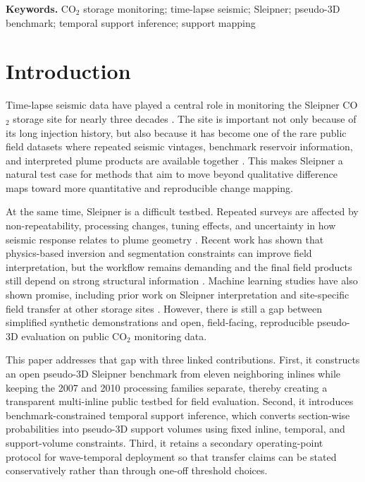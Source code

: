 \documentclass[preprint,12pt]{elsarticle}
\begin{document}
\noindent\textbf{Keywords.} CO$_2$ storage monitoring; time-lapse seismic; Sleipner; pseudo-3D benchmark; temporal support inference; support mapping
\fi

\section{Introduction}

Time-lapse seismic data have played a central role in monitoring the Sleipner CO$_2$ storage site for nearly three decades \citep{furre2017sleipner}. The site is important not only because of its long injection history, but also because it has become one of the rare public field datasets where repeated seismic vintages, benchmark reservoir information, and interpreted plume products are available together \citep{equinor2020seismic,equinor2020benchmark}. This makes Sleipner a natural test case for methods that aim to move beyond qualitative difference maps toward more quantitative and reproducible change mapping.

At the same time, Sleipner is a difficult testbed. Repeated surveys are affected by non-repeatability, processing changes, tuning effects, and uncertainty in how seismic response relates to plume geometry \citep{rickett2001crossequalization,alali2020crossequalization,romero2023joint}. Recent work has shown that physics-based inversion and segmentation constraints can improve field interpretation, but the workflow remains demanding and the final field products still depend on strong structural information \citep{romero2023joint,fachtony2025sleipner}. Machine learning studies have also shown promise, including prior work on Sleipner interpretation and site-specific field transfer at other storage sites \citep{li2021sleipnernn,leong2024seisco2net}. However, there is still a gap between simplified synthetic demonstrations and open, field-facing, reproducible pseudo-3D evaluation on public CO$_2$ monitoring data.

This paper addresses that gap with three linked contributions. First, it constructs an open pseudo-3D Sleipner benchmark from eleven neighboring inlines while keeping the 2007 and 2010 processing families separate, thereby creating a transparent multi-inline public testbed for field evaluation. Second, it introduces benchmark-constrained temporal support inference, which converts section-wise probabilities into pseudo-3D support volumes using fixed inline, temporal, and support-volume constraints. Third, it retains a secondary operating-point protocol for wave-temporal deployment so that transfer claims can be stated conservatively rather than through one-off threshold choices.
\end{document}

